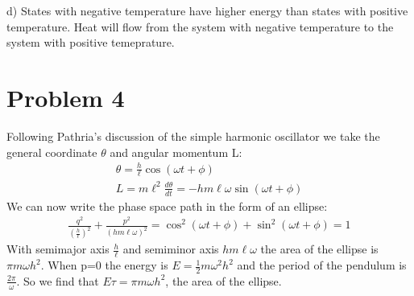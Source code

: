\documentclass[a4paper,10pt]{article}
\numberwithin{equation}{section}
\begin{document}
d) States with negative temperature have higher energy than states with positive temperature. 
Heat will flow from the system with negative temperature to the system with positive temeprature.

\section{Problem 4}
Following Pathria's discussion of the simple harmonic oscillator we take the general coordinate $\theta$ and angular momentum L:
\begin{gather}
 \theta=\frac{h}{\ell}\cos{(\omega t+\phi)}\\
 L=m\ell^2\frac{d\theta}{dt}=-hm\ell\omega\sin{(\omega t+\phi)}
\end{gather}
We can now write the phase space path in the form of an ellipse:
\begin{gather}
 \frac{q^2}{(\frac{h}{\ell})^2}+\frac{p^2}{(hm\ell\omega)^2}=
 \cos^2{(\omega t+\phi)}+\sin^2{(\omega t+\phi)}=1
\end{gather}
With semimajor axis $\frac{h}{\ell}$ and semiminor axis $hm\ell\omega$ the area of the ellipse is $\pi m\omega h^2$.
When p=0 the energy is $E=\frac{1}{2}m\omega^2h^2$ and the period of the pendulum is $\frac{2\pi}{\omega}$.
So we find that $E\tau = \pi m\omega h^2$, the area of the ellipse.
\end{document}
